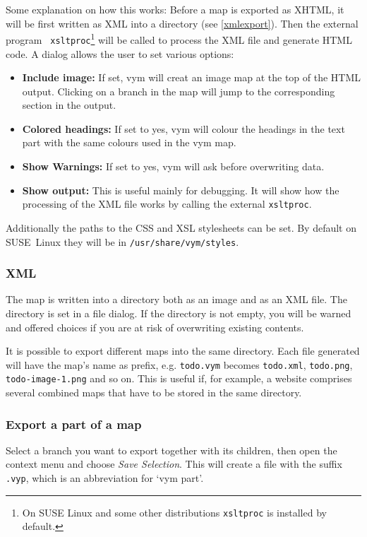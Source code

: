 \documentclass[12pt,a4paper]{article}
\newcommand{\vym}{{\sc vym }}
\begin{document}
Some explanation on how this works: 
Before a map is exported as XHTML, it will be first written as XML into a
directory (see \ref{xmlexport}). Then the external program {\tt
xsltproc}\footnote{On SUSE Linux and some other distributions {\tt xsltproc} is installed by
default.}
will be called to process the XML file and generate HTML code.
A dialog allows the user to set various options:
\begin{itemize}
	\item {\bf Include image:} If set, \vym will creat an image map at
	the top of the HTML output. Clicking on a branch in the map will
	jump to the corresponding section in the output.

	\item {\bf Colored headings:}
	If set to yes, \vym will colour the headings in the text part  with the
	same colours used in the \vym map.
	\item {\bf Show Warnings:}
	If set to yes, \vym will ask before overwriting data.
	\item {\bf Show output:}
	This is useful mainly for debugging. It will show how the processing of
	the XML file works by calling the external {\tt xsltproc}.
\end{itemize}
Additionally the paths to the CSS and XSL stylesheets can be set. By
default on SUSE~Linux they will be in {\tt /usr/share/vym/styles}.


\subsubsection*{XML} \label{xmlexport}
The map is written into a directory both as an image and as an XML file. The
directory is set in a file dialog. If the directory is not empty, you
will be warned and offered choices if you are at risk of overwriting existing contents.

It is possible to export different maps into the same directory. Each
file generated will have the map's name as prefix, e.g. {\tt todo.vym}
becomes {\tt todo.xml}, {\tt todo.png}, {\tt todo-image-1.png} and so
on. This is useful if, for example, a website comprises several combined maps that have to be stored in the same directory.

\subsubsection*{Export a part of a map}
Select a branch you want to export together with its children, then open
the context menu and choose {\em Save Selection}. This will create a
file with the suffix {\tt .vyp}, which is an abbreviation for \lq vym
part\rq.
\end{document}
